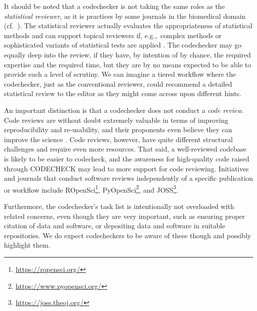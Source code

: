 \documentclass[12pt]{article}
\begin{document}
It should be noted that a codechecker is not taking the same roles as the
\emph{statistical reviewer}, as it is practices by some journals in the 
biomedical domain (cf.~\cite{petrovecki_role_2009,greenwood_how_2015}).
The statistical reviewer actually evaluates the appropriateness of
statistical methods \cite{greenwood_how_2015} and can support topical
reviewers if, e.g.,~complex methods or sophisticated variants of statistical
tests are applied \cite{petrovecki_role_2009}.
The codechecker may go equally deep into the review, if they have, by 
intention of by chance, the required expertise and the required time, 
but they are by no means expected to be able to provide
such a level of scrutiny. We can imagine a tiered workflow where the 
codechecker, just as the conventional reviewer, could recommend a detailed
statistical review to the editor as they might come across upon different
hints.

An important distinction is that a codechecker does not conduct a 
\emph{code review}. Code reviews are without doubt extremely valuable in 
terms of improving reproducibility and re-usability, and their proponents 
even believe they can improve the science \cite{petre_code_2014}.
Code reviews, however, have quite different structural challenges and 
require even more resources. That said, a well-reviewed codebase is likely
to be easier to codecheck, and the awareness for high-quality code raised
through CODECHECK may lead to more support for code reviewing.
Initiatives and journals that conduct software reviews independently of 
a specific publication or workflow include
ROpenSci\footnote{\url{https://ropensci.org/}},
PyOpenSci\footnote{\url{https://www.pyopensci.org/}},
and JOSS\footnote{\url{https://joss.theoj.org/}}.

Furthermore, the codechecker's task list is intentionally not
overloaded with related concerns, even though they are very important,
such as ensuring proper citation of data and software, or depositing
data and software in suitable repositories. We do expect codecheckers
to be aware of these though and possibly highlight them.
\end{document}

